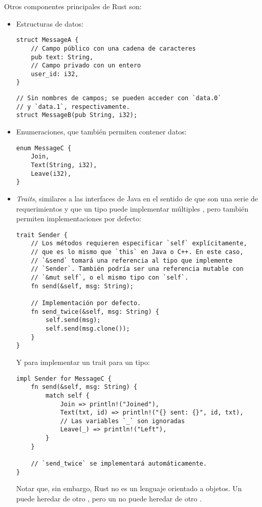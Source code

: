 Otros componentes principales de Rust son:

\begin{itemize}
    \item Estructuras de datos:

\begin{verbatim}
struct MessageA {
    // Campo público con una cadena de caracteres
    pub text: String,
    // Campo privado con un entero
    user_id: i32,
}
\end{verbatim}

\begin{verbatim}
// Sin nombres de campos; se pueden acceder con `data.0`
// y `data.1`, respectivamente.
struct MessageB(pub String, i32);
\end{verbatim}

    \item Enumeraciones, que también permiten contener datos:

\begin{verbatim}
enum MessageC {
    Join,
    Text(String, i32),
    Leave(i32),
}
\end{verbatim}

    \item \emph{Traits}, similares a las interfaces de Java en el sentido de que
        son una serie de requerimientos y que un tipo puede implementar
        múltiples \traits, pero también permiten implementaciones por defecto:

\begin{verbatim}
trait Sender {
    // Los métodos requieren especificar `self` explícitamente,
    // que es lo mismo que `this` en Java o C++. En este caso,
    // `&send` tomará una referencia al tipo que implemente
    // `Sender`. También podría ser una referencia mutable con
    // `&mut self`, o el mismo tipo con `self`.
    fn send(&self, msg: String);

    // Implementación por defecto.
    fn send_twice(&self, msg: String) {
        self.send(msg);
        self.send(msg.clone());
    }
}
\end{verbatim}

        Y para implementar un trait para un tipo:

\begin{verbatim}
impl Sender for MessageC {
    fn send(&self, msg: String) {
        match self {
            Join => println!("Joined"),
            Text(txt, id) => println!("{} sent: {}", id, txt),
            // Las variables `_` son ignoradas
            Leave(_) => println!("Left"),
        }
    }

    // `send_twice` se implementará automáticamente.
}
\end{verbatim}

    Notar que, sin embargo, Rust no es un lenguaje orientado a objetos. Un
    \trait puede heredar de otro \trait, pero un \struct no puede heredar de
    otro \struct.

\end{itemize}

